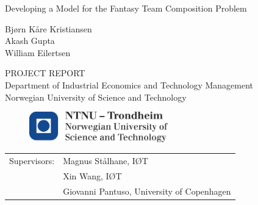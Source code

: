 \vspace*{7cm}


\begin{center}{\vspace{-7cm}}
{\Huge Developing a Model for the Fantasy Team Composition Problem}
\end{center}
\vspace*{7cm}

\begin{center}{\vspace{-4cm}}
{\Large Bj\o rn K\aa re Kristiansen} \\ 
{\Large Akash Gupta} \\
{\Large William Eilertsen}
\end{center}

\begin{center}{\vspace{2cm}}
   PROJECT REPORT \\ 
   Department of Industrial Economics and Technology Management\\
Norwegian University of Science and Technology
\end{center}

\begin{figure}[H]{\vspace{0.5cm}}
    \centering
    \includegraphics[width = 60mm,scale=0.5]{fig/ntnu_logo.png}
\end{figure}


\begin{table}[b]
    \begin{tabular}{ll}
       Supervisors:  & Magnus St\aa lhane, I\O T \\ 
                     & Xin Wang, I\O T \\
                     & Giovanni Pantuso, University of Copenhagen \\ 
    \end{tabular}
\end{table}

\cleardoublepage